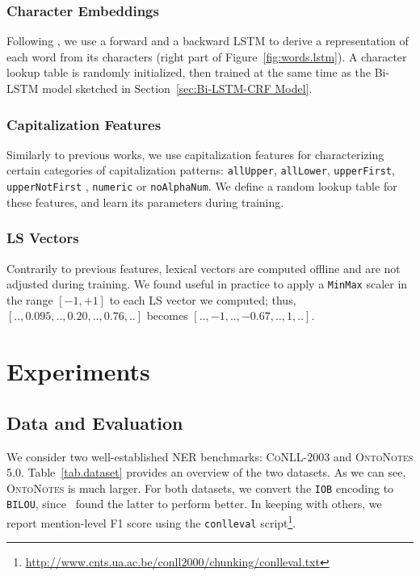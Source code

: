 \documentclass[11pt]{article}
\newcommand{\conll}{\textsc{CoNLL}}
\newcommand{\onto}{\textsc{OntoNotes}}
\newcommand{\lr}{\textsc{LS}}
\begin{document}
	
	\subsubsection{Character Embeddings}
	\label{sec:Chars}
	
	
	Following  \cite{lample2016neural}, we use a forward and a backward LSTM to derive a representation of each word from its characters (right part of Figure~\ref{fig:words.lstm}). A character lookup table is randomly initialized, then trained at the same time as the Bi-LSTM model sketched  in Section~\ref{sec:Bi-LSTM-CRF Model}.
	
	\subsubsection{Capitalization Features}
	\label{sec:Caps}
	
	Similarly to previous works, we use capitalization features for characterizing certain categories of capitalization patterns: \texttt{allUpper}, \texttt{allLower}, \texttt{upperFirst}, \texttt{upperNotFirst} , \texttt{numeric} or \texttt{noAlphaNum}. We define a random lookup table for these features, and learn its parameters during training.
	
	\subsubsection{\lr{} Vectors}
	
	Contrarily to previous features, lexical vectors are computed offline and are not adjusted during training. 
	We found useful in practice to apply a \texttt{MinMax} scaler in the range $[-1,+1]$ to each \lr{} vector we computed; thus, $[.., 0.095, .., 0.20,.., 0.76,..]$  becomes $[..,-1,..,-0.67,..,1,..]$.
	
\section{Experiments}
	\label{sec:Experiments}

	\subsection{Data and Evaluation}
	\label{sec:Datasets}
	
	We consider two well-established NER benchmarks: \conll{-2003} and \onto{ 5.0}. Table~\ref{tab.dataset} provides an overview of the two datasets. As we can see, \onto{} is much larger. 
	For both datasets, we convert the \texttt{IOB} encoding to \texttt{BILOU}, since~ found the latter to perform better. In keeping with others, we report mention-level F1 score using the \texttt{conlleval} script\footnote{\url{http://www.cnts.ua.ac.be/conll2000/chunking/conlleval.txt}}.
	
\end{document}
